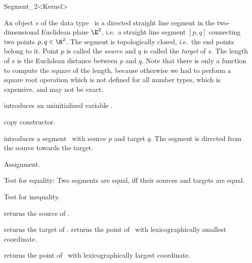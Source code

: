 \begin{ccRefClass} {Segment_2<Kernel>}


\ccDefinition  An object $s$ of the data type \ccRefName\ is a directed
straight line segment in the two-dimensional Euclidean plane $\E^2$, i.e.\ a
straight line segment $[p,q]$ connecting two points $p,q \in \R^2$.
The segment is topologically closed, i.e.\  the end
points belong to it. Point $p$ is called the {\em source} and $q$
is called the {\em target} of $s$. The length of $s$ is the
Euclidean distance between $p$ and $q$. Note that there is only a function
to compute the square of the length, because otherwise we had to
perform a square root operation which is not defined for all
number types, which is expensive, and may not be exact.

\ccCreation
{}


\ccHidden {}
             {introduces an uninitialized variable \ccVar.}

\ccHidden {}
            {copy constructor.}

            {introduces a segment \ccVar\ with source $p$
             and target $q$. The segment is directed from the source towards
             the target.}


\ccOperations

\ccHidden {}
        {Assignment.}

       {Test for equality: Two segments are equal, iff their sources and
        targets are equal.}

       {Test for inequality.}


       {returns the source of \ccVar.}

       {returns the target of \ccVar.}
\ccGlue
{}
       {returns the point of \ccVar\ with lexicographically smallest coordinate.}

       {returns the point of \ccVar\ with lexicographically largest coordinate.}



\end{ccRefClass}
